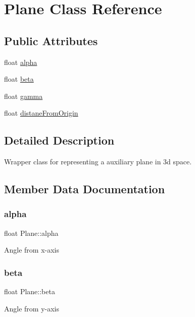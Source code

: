 \hypertarget{class_plane}{}\section{Plane Class Reference}
\label{class_plane}
\subsection*{Public Attributes}
\begin{DoxyCompactItemize}
\item 
float \hyperlink{class_plane_af8a305f4c8843176ef303fd656e735f5}{alpha}
\item 
float \hyperlink{class_plane_a0cc0061c74aedd37e8625efbd0fcaf2d}{beta}
\item 
float \hyperlink{class_plane_a5f227a19874cd026ad2027a42749448b}{gamma}
\item 
float \hyperlink{class_plane_ad1d6d4d6722e4815fdf729650bf7c8f6}{distane\+From\+Origin}
\end{DoxyCompactItemize}


\subsection{Detailed Description}
Wrapper class for representing a auxiliary plane in 3d space. 

\subsection{Member Data Documentation}
\mbox{\label{class_plane_af8a305f4c8843176ef303fd656e735f5}} 
\subsubsection{\texorpdfstring{alpha}{alpha}}
{\footnotesize\ttfamily float Plane\+::alpha}

Angle from x-\/axis \mbox{\label{class_plane_a0cc0061c74aedd37e8625efbd0fcaf2d}} 
\subsubsection{\texorpdfstring{beta}{beta}}
{\footnotesize\ttfamily float Plane\+::beta}

Angle from y-\/axis \mbox{\label{class_plane_ad1d6d4d6722e4815fdf729650bf7c8f6}} 
